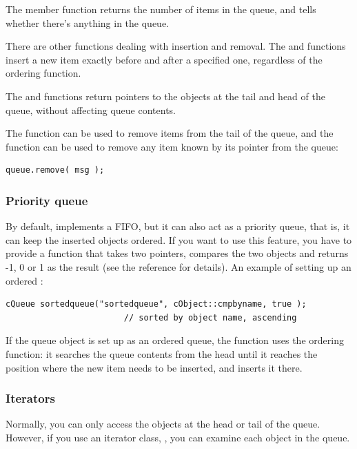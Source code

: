 The  member function returns the number of items in the
queue, and  tells whether there's anything in the queue.

There are other functions dealing with insertion and removal.  The
 and  functions insert a
new item exactly before and after a specified one, regardless of the
ordering function.

The  and  functions return pointers to the objects
at the tail and head of the queue, without affecting queue contents.

The  function can be used to remove items from the
tail of the queue, and the  function can be
used to remove any item known by its pointer from the queue:

\begin{verbatim}
queue.remove( msg );
\end{verbatim}



\subsubsection{Priority queue}


By default,  implements a FIFO, but it can also act as
a priority queue, that is, it can keep the inserted objects
ordered.  If you want to use this feature, you have
to provide a function that takes two  pointers,
compares the two objects and returns -1, 0 or 1 as the result (see the
reference for details).  An example of setting up an ordered
:

\begin{verbatim}
cQueue sortedqueue("sortedqueue", cObject::cmpbyname, true );
                        // sorted by object name, ascending
\end{verbatim}


If the queue object is set up as an ordered queue, the 
function uses the ordering function: it searches the queue contents
from the head until it reaches the position where the new item
needs to be inserted, and inserts it there.


\subsubsection{Iterators}


Normally, you can only access the objects at the head or tail of the
queue. However, if you use an iterator class, ,
you can examine each object in the queue.

